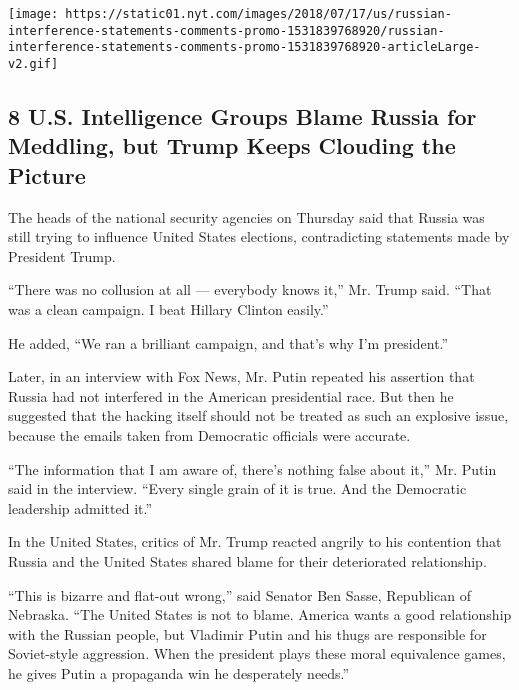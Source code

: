 \href{https://www.nytimes.com/interactive/2018/07/16/us/elections/russian-interference-statements-comments.html}{}

\texttt{[image: https://static01.nyt.com/images/2018/07/17/us/russian-interference-statements-comments-promo-1531839768920/russian-interference-statements-comments-promo-1531839768920-articleLarge-v2.gif]}

\hypertarget{8-us-intelligence-groups-blame-russia-for-meddling-but-trump-keeps-clouding-the-picture}{%
\subsection{8 U.S. Intelligence Groups Blame Russia for Meddling, but
Trump Keeps Clouding the
Picture}\label{8-us-intelligence-groups-blame-russia-for-meddling-but-trump-keeps-clouding-the-picture}}

The heads of the national security agencies on Thursday said that Russia
was still trying to influence United States elections, contradicting
statements made by President Trump.

``There was no collusion at all --- everybody knows it,'' Mr. Trump
said. ``That was a clean campaign. I beat Hillary Clinton easily.''

He added, ``We ran a brilliant campaign, and that's why I'm president.''

Later, in an interview with Fox News, Mr. Putin repeated his assertion
that Russia had not interfered in the American presidential race. But
then he suggested that the hacking itself should not be treated as such
an explosive issue, because the emails taken from Democratic officials
were accurate.

``The information that I am aware of, there's nothing false about it,''
Mr. Putin said in the interview. ``Every single grain of it is true. And
the Democratic leadership admitted it.''

In the United States, critics of Mr. Trump reacted angrily to his
contention that Russia and the United States shared blame for their
deteriorated relationship.

``This is bizarre and flat-out wrong,'' said Senator Ben Sasse,
Republican of Nebraska. ``The United States is not to blame. America
wants a good relationship with the Russian people, but Vladimir Putin
and his thugs are responsible for Soviet-style aggression. When the
president plays these moral equivalence games, he gives Putin a
propaganda win he desperately needs.''

